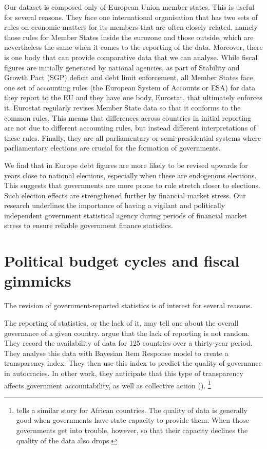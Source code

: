 \documentclass[]{article}
\begin{document}
Our dataset is composed only of European Union member states. This is useful for several reasons. They face one international organisation that has two sets of rules on economic matters for its members that are often closely related, namely those rules for Member States inside the eurozone and those outside, which are nevertheless the same when it comes to the reporting of the data. Moreover, there is one body that can provide comparative data that we can analyse. While fiscal figures are initially generated by national agencies, as part of Stability and Growth Pact (SGP) deficit and debt limit enforcement, all Member States face one set of accounting rules (the European System of Accounts or ESA) for data they report to the EU and they have one body, Eurostat, that ultimately enforces it. Eurostat regularly revises Member State data so that it conforms to the common rules. This means that differences across countries in initial reporting are not due to different accounting rules, but instead different interpretations of these rules. Finally, they are all parliamentary or semi-presidential systems where parliamentary elections are crucial for the formation of governments.

We find that in Europe debt figures are more likely to be revised upwards for years close to national elections, especially when these are endogenous elections. This suggests that governments are more prone to rule stretch closer to elections. Such election effects are strengthened further by financial market stress. Our research underlines the importance of having a vigilant and politically independent government statistical agency during periods of financial market stress to ensure reliable government finance statistics.

\section{Political budget cycles and fiscal gimmicks}

The revision of government-reported statistics is of interest for several reasons.

The reporting of statistics, or the lack of it, may tell one about the overall governance of a given country. \cite{Hollyer2014} argue that the lack of reporting is not random. They record the availability of data for 125 countries over a thirty-year period. They analyse this data with Bayesian Item Response model to create a transparency index. They then use this index to predict the quality of governance in autocracies. In other work, they anticipate that this type of transparency affects government accountability, as well as collective action (\cite{hollyerforthcoming}). \footnote{\cite{jervin2013} tells a similar story for African countries. The quality of data is generally good when governments have state capacity to provide them. When those governments get into trouble, however, so that their capacity declines the quality of the data also drops.}
\end{document}
